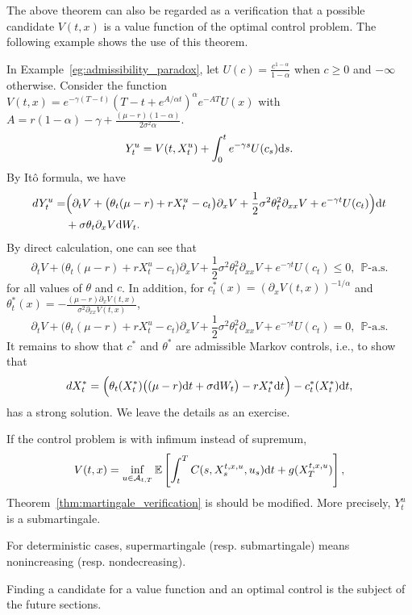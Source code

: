 \documentclass[11pt]{book}
\newcommand{\dt}{\text{\normalfont d}t}
\newcommand{\ds}{\text{\normalfont d}s}
\newcommand{\dW}{\text{\normalfont d}W}
\begin{document}
The above theorem can also be regarded as a verification that a possible candidate $V(t,x)$ is a value function of the optimal control problem. The following example shows the use of this theorem.
\begin{eg}\label{eg:martingle_consumption}
In Example~\ref{eg:admissibility_paradox}, let $U(c)=\frac{c^{1-\alpha}}{1-\alpha}$ when $c\ge0$ and $-\infty$ otherwise. Consider the function $V(t,x)=e^{-\gamma (T-t)}(T-t+e^{A/\alpha t})^{\alpha}e^{-AT}U(x)$ with $A=r(1-\alpha)-\gamma+\frac{(\mu-r)(1-\alpha)}{2\sigma^2\alpha}$.
	\begin{equation}
		Y^u_t=V(t,X_t^u)+\int_0^te^{-\gamma s}U(c_s){{\ds}}.
	\end{equation}
	By It\^o formula, we have 
	\begin{equation}
	\begin{split}
				dY_t^u=&\Big(\partial_t V+ \big(\theta_t(\mu-r)+rX^u_t-c_t\big)\partial_x V+ 
\frac12\sigma^2\theta_t^2\partial_{xx} V+e^{-\gamma t}U(c_t)\Big){{\dt}}\\
		&+\sigma\theta_t\partial_x V \dW_t. 
	\end{split}
	\end{equation}
	By direct calculation, one can see that 
	\begin{equation}
		\partial_t V+ \big(\theta_t(\mu-r)+rX^u_t-c_t\big)\partial_x V
		+\frac12\sigma^2\theta_t^2\partial_{xx} V+e^{-\gamma t}U(c_t)\le0,~~\mathbb{P}\textrm{-a.s.}
	\end{equation}
	for all values of  $\theta$ and $c$. In addition, for $c^*_t(x)=(\partial_x V(t,x))^{-1/\alpha}$ and $\theta^*_t(x)=-\frac{(\mu-r)\partial_xV(t,x)}{\sigma^2\partial_{xx}V(t,x)}$, 
	\begin{equation}
		\partial_t V+ \big(\theta_t(\mu-r)+rX^u_t-c_t\big)\partial_x V
		+\frac12\sigma^2\theta_t^2\partial_{xx} V+e^{-\gamma t}U(c_t)=0,~~\mathbb{P}\textrm{-a.s.}
	\end{equation}
It remains to show that $c^*$ and $\theta^*$ are admissible Markov controls, i.e., to show that 
	\begin{equation}
		dX^*_t=\Big(\theta_t(X^*_t)\big((\mu-r) {{\dt}}+\sigma \dW_t\big)-rX^*_t{{\dt}}\Big)-c^*_t(X^*_t){{\dt}},
	\end{equation}
	has a strong solution. We leave the details as an exercise. 
\end{eg}
\begin{rem}\label{rem:inf_submartingale}
If the control problem is with infimum instead of supremum,
\begin{equation}
V(t,x)=\inf_{u\in\mathcal{A}_{t,T}}\mathbb{E}\left[\int_{t}^{T}C(s,X_s^{t,x,u},u_s){{\dt}}+g(X_T^{t,x,u})\right],
\end{equation}
Theorem~\ref{thm:martingale_verification} is should be modified. More precisely, $Y_t^u$ is a submartingale. 

For deterministic cases, supermartingale (resp. submartingale) means nonincreasing (resp. nondecreasing).
\end{rem}
Finding a candidate for a value function and an optimal control is the subject of the future sections.
\end{document}
